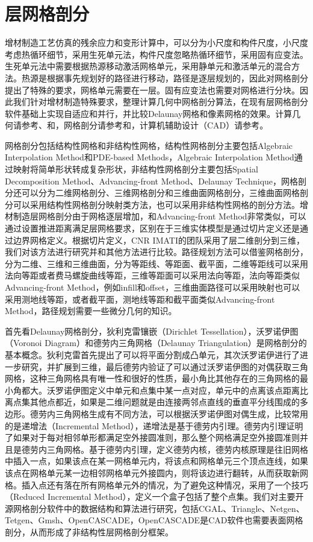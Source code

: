 \chapter{层网格剖分}

增材制造工艺仿真的残余应力和变形计算中，可以分为小尺度和构件尺度，小尺度考虑热循环细节，采用生死单元法，构件尺度忽略热循环细节，采用固有应变法。生死单元法中需要根据热源移动激活网格单元，采用静单元和激活单元的混合方法。热源是根据事先规划好的路径进行移动，路径是逐层规划的，因此对网格剖分提出了特殊的要求，网格单元需要在一层。固有应变法也需要对网格进行分块。因此我们针对增材制造特殊要求，整理计算几何中网格剖分算法，在现有层网格剖分软件基础上实现自适应和并行，并比较Delaunay网格和像素网格的效果。计算几何请参考\cite{JeanMarietteHerve}、\cite{JakobJensFrançoisHenrik}和\cite{MarkMarcMarkOtfried}，网格剖分请参考\cite{PascalPaul}和\cite{PaulHouman}，计算机辅助设计（CAD）请参考\cite{Erich}。

网格剖分包括结构性网格和非结构性网格，结构性网格剖分主要包括Algebraic Interpolation Method和PDE-based Methods，Algebraic Interpolation Method通过映射将简单形状转成复杂形状，非结构性网格剖分主要包括Spatial Decomposition Method、Advancing-front Method、Delaunay Technique，网格剖分还可以分为二维网格剖分、三维网格剖分和三维曲面网格剖分，三维曲面网格剖分可以采用结构性网格剖分映射类方法，也可以采用非结构性网格的剖分方法。增材制造层网格剖分由于网格逐层增加，和Advancing-front Method非常类似，可以通过设置推进距离满足层网格要求，区别在于三维实体模型是通过切片定义还是通过边界网格定义。根据切片定义，CNR IMATI的团队采用了层二维剖分到三维，我们对该方法进行研究并和其他方法进行比较。路径规划方法可以借鉴网格剖分，分为二维、三维和三维曲面，分为等距线、等距面、截平面，二维等距线可以采用法向等距或者费马螺旋曲线等距，三维等距面可以采用法向等距，法向等距类似Advancing-front Method，例如infill和offset，三维曲面路径可以采用映射也可以采用测地线等距，或者截平面，测地线等距和截平面类似Advancing-front Method，路径规划需要一些微分几何的知识。

首先看Delaunay网格剖分，狄利克雷镶嵌（Dirichlet Tessellation），沃罗诺伊图（Voronoi Diagram）和德劳内三角网格（Delaunay Triangulation）是网格剖分的基本概念。狄利克雷首先提出了可以将平面分割成凸单元，其次沃罗诺伊进行了进一步研究，并扩展到三维，最后德劳内验证了可以通过沃罗诺伊图的对偶获取三角网格，这种三角网格具有唯一性和很好的性质，最小角比其他存在的三角网格的最小角都大。沃罗诺伊图定义中单元和点集中某一点对应，单元中的点离该点距离比离点集其他点都近，如果是二维问题就是由连接两邻点直线的垂直平分线围成的多边形。德劳内三角网格生成有不同方法，可以根据沃罗诺伊图对偶生成，比较常用的是递增法（Incremental Method），递增法是基于德劳内引理。德劳内引理证明了如果对于每对相邻单形都满足空外接圆准则，那么整个网格满足空外接圆准则并且是德劳内三角网格。基于德劳内引理，定义德劳内核，德劳内核原理是往旧网格中插入一点，如果该点在某一网格单元内，将该点和网格单元三个顶点连线，如果该点在网格单元某一边相邻网格单元外接圆内，则将该边进行翻转，从而获取新网格。插入点还有落在所有网格单元外的情况，为了避免这种情况，采用了一个技巧（Reduced Incremental Method），定义一个盒子包括了整个点集。我们对主要开源网格剖分软件中的数据结构和算法进行研究，包括CGAL、Triangle、Netgen、Tetgen、Gmsh、OpenCASCADE，OpenCASCADE是CAD软件也需要表面网格剖分，从而形成了非结构性层网格剖分框架。


